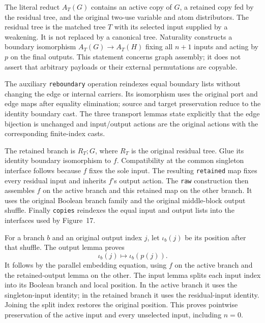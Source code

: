 The literal reduct $A_T(G)$ contains an active copy of $G$, a retained copy fed
by the residual tree, and the original two-use variable and atom distributors.
The residual tree is the matched tree $T$ with its selected input supplied by
a weakening. It is not replaced by a canonical tree. Naturality constructs a
boundary isomorphism $A_T(G)\to A_T(H)$ fixing all $n+1$ inputs and acting by
$p$ on the final outputs. This statement concerns graph assembly; it does not
assert that arbitrary payloads or their external permutations are copyable.

The auxiliary \texttt{reboundary} operation reindexes equal boundary lists
without changing the edge or internal carriers. Its isomorphism uses the
original port and edge maps after equality elimination; source and target
preservation reduce to the identity boundary cast. The three transport lemmas
state explicitly that the edge bijection is unchanged and input/output actions
are the original actions with the corresponding finite-index casts.


The retained branch is $R_T;G$, where $R_T$ is the original residual tree.
Glue its identity boundary isomorphism to $f$. Compatibility at the common
singleton interface follows because $f$ fixes the sole input. The resulting
\texttt{retained} map fixes every residual input and inherits $f$'s output action.
The \texttt{raw} construction then assembles $f$ on the active branch and this
retained map on the other branch. It uses the original Boolean branch family
and the original middle-block output shuffle. Finally \texttt{copies} reindexes
the equal input and output lists into the interfaces used by Figure~17.


For a branch $b$ and an original output index $j$, let $\iota_b(j)$ be its
position after that shuffle. The output lemma proves
\[
 \iota_b(j)\longmapsto\iota_b(p(j)).
\]
It follows by the parallel embedding equation, using $f$ on the active branch
and the retained-output lemma on the other. The input lemma splits each input
index into its Boolean branch and local position. In the active branch it uses
the singleton-input identity; in the retained branch it uses the residual-input
identity. Joining the split index restores the original position. This proves
pointwise preservation of the active input and every unselected input, including
$n=0$.

